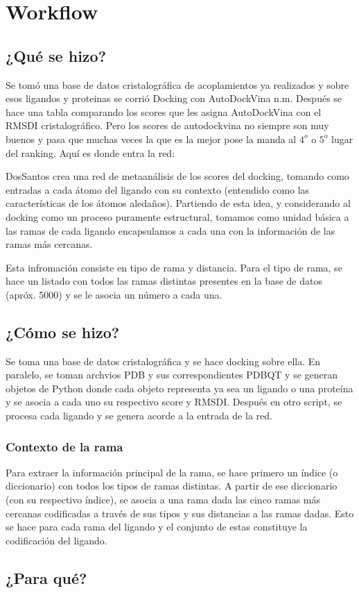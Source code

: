 \section{Workflow}
\subsection{¿Qué se hizo?}
Se tomó una base de datos cristalográfica de acoplamientos ya
realizados y sobre esos ligandos y proteinas se corrió Docking con
AutoDockVina n.m. Después se hace una tabla comparando los scores que
les asigna AutoDockVina con el RMSDI cristalográfico. Pero los scores
de autodockvina no siempre son muy buenos y pasa que muchas veces la
que es la mejor pose la manda al $4^o$ o $5^o$ lugar del ranking.
Aquí es donde entra la red:

DosSantos \cite{dossantos} crea una red de metaanálisis de los scores
del docking, tomando como entradas a cada átomo del ligando con su
contexto (entendido como las características de los átomos aledaños).
Partiendo de esta idea, y considerando al docking como un proceso
puramente estructural, tomamos como unidad básica a las ramas de cada
ligando encapsulamos a cada una con la información de las ramas más
cercanas.

Esta infromación consiste en tipo de rama y distancia. Para el tipo
de rama, se hace un listado con todos las ramas distintas presentes en
la base de datos (apróx. 5000) y se le asocia un número a cada una.

\subsection{¿Cómo se hizo?}
Se toma una base de datos cristalográfica y se hace docking sobre
ella. En paralelo, se toman archvios PDB y sus correspondientes PDBQT
y se generan objetos de Python donde cada objeto representa ya sea un
ligando o una proteína y se asocia a cada uno su respectivo score y
RMSDI. Después en otro script, se procesa cada ligando y se genera
acorde a la entrada de la red.
\subsubsection{Contexto de la rama}
Para extraer la información principal de la rama, se hace primero un
índice (o diccionario) con todos los tipos de ramas distintas. A
partir de ese diccionario (con su respectivo índice), se asocia a una
rama dada las cinco ramas más cercanas codificadas a través de sus
tipos y sus distancias a las ramas dadas. Esto se hace para cada rama
del ligando y el conjunto de estas constituye la codificación del ligando.
\subsection{¿Para qué?}

